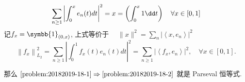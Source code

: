 \begin{enumerate}
\begin{enumerate}
        \end{enumerate}
        \begin{answer}
            \[
                \sum_{n \geq 1}\left|\int_{0}^{x} e_{n}(t) d t\right|^{2}=x=\left(\int_{0}^{x}1 \dt \right) \quad \forall x \in[0,1]
                \]
                记$f_{x}=\symbb{1}_{(0, x)}$, 上式等价于 $\quad\|x\|^{2}=\sum_{n}\left|\left\langle x, e_{n}\right\rangle\right|^{2}$
                \begin{equation}\label{eq:20182019-18-1}
                    \left\|f_{x}\right\|_{L_{2}}^{2}=\sum_{n \geq 1}\left|\int_{0}^{1} f_{x}(t) e_{n}(t) d t\right|^{2}=\sum_{n \geq 1}\left|\left\langle f_{x}, e_{n}\right\rangle\right|^{2}, \quad \forall x \in[0,1] .
                \end{equation}

                
                那么 $\ref{problem:20182019-18-1} \Rightarrow \ref{problem:20182019-18-2}$ 就是 Parseval 恒等式.


\end{answer}
\end{enumerate}
